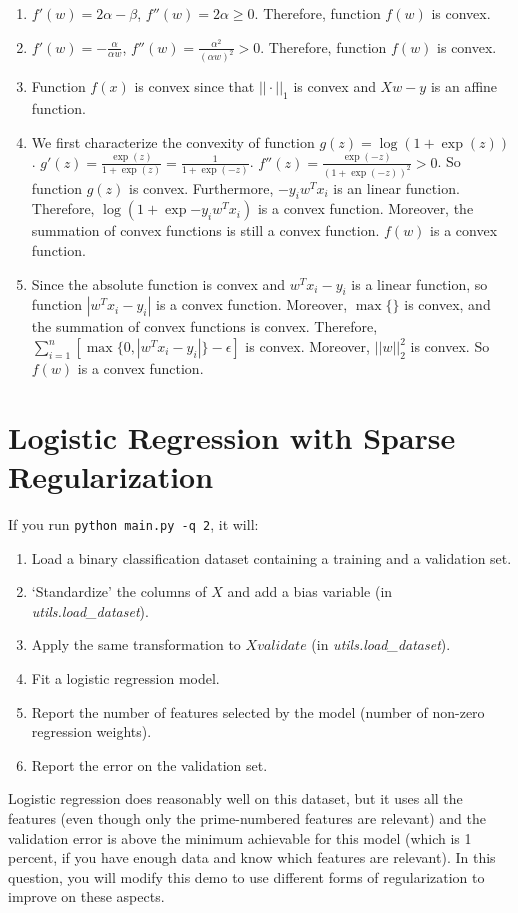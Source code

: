 \documentclass{article}
\def\gre#1{{\color{gre}#1}}
\def\enum#1{\begin{enumerate}#1\end{enumerate}}
\begin{document}
\gre{\begin{enumerate}
    \item $f'(w) = 2\alpha - \beta$, $f''(w) = 2\alpha \geq 0$. Therefore, function $f(w)$ is convex.
    \item $f'(w) = -\frac{\alpha}{\alpha w}$, $f''(w) = \frac{\alpha^2}{(\alpha w)^2}>0$. Therefore, function $f(w)$ is convex.
    \item Function $f(x)$ is convex since that $||\cdot||_1$ is convex and $Xw-y$ is an affine function.
    \item We first characterize the convexity of function $g(z) = \log(1+\exp{(z)})$. $g'(z) = \frac{\exp{(z)}}{1+\exp{(z)}} = \frac{1}{1+\exp{(-z)}}$. $f''(z) = \frac{\exp{(-z)}}{(1+\exp{(-z)})^2}>0$. So function $g(z)$ is convex. Furthermore, $-y_i w^Tx_i$ is an linear function. Therefore, $\log(1+\exp{-y_iw^Tx_i})$ is a convex function. Moreover, the summation of convex functions is still a convex function. $f(w)$ is a convex function.
    \item Since the absolute function is convex and $w^Tx_i-y_i$ is a linear function, so function $|w^Tx_i-y_i|$ is a convex function. Moreover, $\max\{\}$ is convex, and the summation of convex functions is convex. Therefore, $\sum_{i=1}^n[\max\{0, |w^Tx_i-y_i|\} - \epsilon]$ is convex. Moreover, $||w||_2^2$ is convex. So $f(w)$ is a convex function.
\end{enumerate}
}


\section{Logistic Regression with Sparse Regularization}

If you run  \verb|python main.py -q 2|, it will:
\enum{
\item Load a binary classification dataset containing a training and a validation set.
\item `Standardize' the columns of $X$ and add a bias variable (in \emph{utils.load\_dataset}).
\item Apply the same transformation to $Xvalidate$ (in \emph{utils.load\_dataset}).
\item Fit a logistic regression model.
\item Report the number of features selected by the model (number of non-zero regression weights).
\item Report the error on the validation set.
}
Logistic regression does reasonably well on this dataset,
but it uses all the features (even though only the prime-numbered features are relevant)
and the validation error is above the minimum achievable for this model
(which is 1 percent, if you have enough data and know which features are relevant).
In this question, you will modify this demo to use different forms of regularization
 to improve on these aspects.
\end{document}

